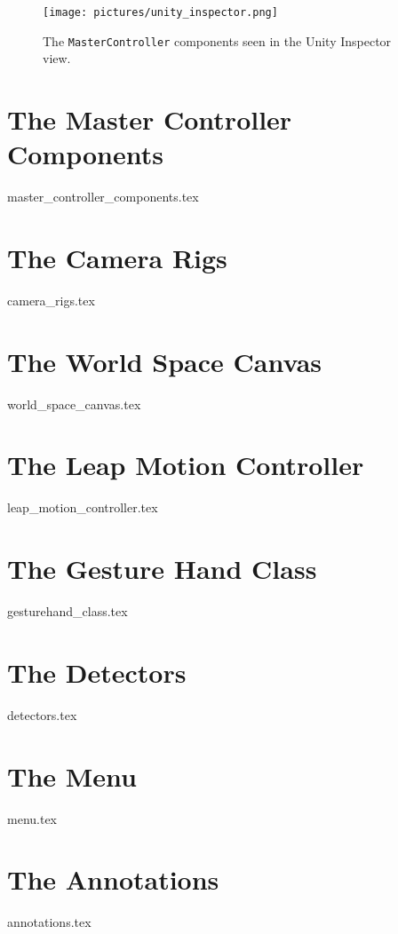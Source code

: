 \begin{figure}%
	\texttt{[image: pictures/unity\_inspector.png]} %
	\caption[The \texttt{MasterController} components]{The \texttt{MasterController} components seen in the Unity Inspector view.}
	\label{fig:unity_inspector}
\end{figure} 

\section{The Master Controller Components}
{master_controller_components.tex}


\section{The Camera Rigs}
\label{sec:camera_rigs}
{camera_rigs.tex}


\section{The World Space Canvas}
\label{sec:world_space_canvas}
{world_space_canvas.tex}


\section{The Leap Motion Controller}
\label{sec:leap_motion_controller}
{leap_motion_controller.tex}


\section{The Gesture Hand Class}
\label{sec:gesturehand_class}
{gesturehand_class.tex}
 

\section{The Detectors}
\label{sec:detectors}
{detectors.tex}


\section{The Menu}
\label{sec:menu}
{menu.tex}


\section{The Annotations}
\label{sec:annotations}
{annotations.tex}


